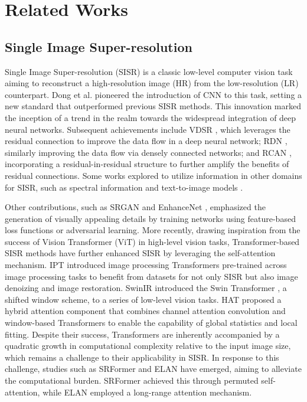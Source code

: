 \section{Related Works}
\subsection{Single Image Super-resolution}
Single Image Super-resolution (SISR) is a classic low-level computer vision task aiming to reconstruct a high-resolution image (HR) from the low-resolution (LR) counterpart. Dong et al. \cite{dongSRCNN_ECCV2014} pioneered the introduction of CNN to this task, setting a new standard that outperformed previous SISR methods. This innovation marked the inception of a trend in the realm towards the widespread integration of deep neural networks. Subsequent achievements include VDSR \cite{kimVDSR_CVPR2016}, which leverages the residual connection to improve the data flow in a deep neural network; RDN \cite{zhangRDN_CVPR2018}, similarly improving the data flow via densely connected networks; and RCAN \cite{zhangRCAN_ECCV2018}, incorporating a residual-in-residual structure to further amplify the benefits of residual connections. Some works explored to utilize information in other domains for SISR, such as spectral information \cite{esmaeilzehi_TCI2021} and text-to-image models \cite{wuSeeSR_arXiv2023}.

Other contributions, such as SRGAN \cite{ledigSRGAN_CVPR2017} and EnhanceNet \cite{SajjadiEnhanceNet_ICCV2017}, emphasized the generation of visually appealing details by training networks using feature-based loss functions or adversarial learning. More recently, drawing inspiration from the success of Vision Transformer (ViT) \cite{ViT} in high-level vision tasks, Transformer-based SISR methods have further enhanced SISR by leveraging the self-attention mechanism. IPT \cite{chenIPT_CVPR2021} introduced image processing Transformers pre-trained across image processing tasks to benefit from datasets for not only SISR but also image denoizing and image restoration. SwinIR \cite{liangSwinIR_ICCV2021} introduced the Swin Transformer \cite{liuSwin_ICCV2021}, a shifted window scheme, to a series of low-level vision tasks. HAT \cite{chenHAT_CVPR2023} proposed a hybrid attention component that combines channel attention convolution and window-based Transformers to enable the capability of global statistics and local fitting. Despite their success, Transformers are inherently accompanied by a quadratic growth in computational complexity relative to the input image size, which remains a challenge to their applicability in SISR. In response to this challenge, studies such as SRFormer \cite{zhouSRFormer_ICCV2023} and ELAN \cite{zhangELAN_ECCV2022} have emerged, aiming to alleviate the computational burden. SRFormer \cite{zhouSRFormer_ICCV2023} achieved this through permuted self-attention, while ELAN \cite{zhangELAN_ECCV2022} employed a long-range attention mechanism.

